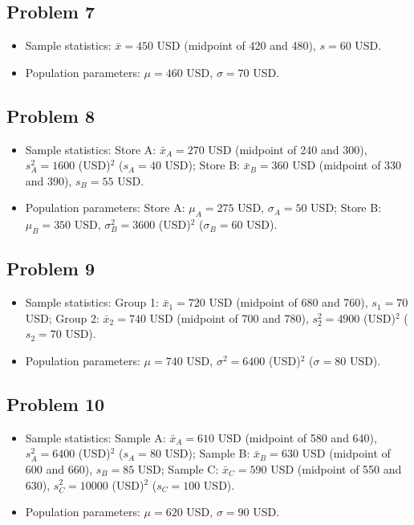 \subsection*{Problem 7}
\begin{itemize}
    \item Sample statistics: $\bar{x}=450$ USD (midpoint of 420 and 480), $s=60$ USD.
    \item Population parameters: $\mu=460$ USD, $\sigma=70$ USD.
\end{itemize}

\subsection*{Problem 8}
\begin{itemize}
    \item Sample statistics: Store A: $\bar{x}_A=270$ USD (midpoint of 240 and 300), $s_A^2=1600$ (USD)$^2$ ($s_A=40$ USD); Store B: $\bar{x}_B=360$ USD (midpoint of 330 and 390), $s_B=55$ USD.
    \item Population parameters: Store A: $\mu_A=275$ USD, $\sigma_A=50$ USD; Store B: $\mu_B=350$ USD, $\sigma_B^2=3600$ (USD)$^2$ ($\sigma_B=60$ USD).
\end{itemize}

\subsection*{Problem 9}
\begin{itemize}
    \item Sample statistics: Group 1: $\bar{x}_1=720$ USD (midpoint of 680 and 760), $s_1=70$ USD; Group 2: $\bar{x}_2=740$ USD (midpoint of 700 and 780), $s_2^2=4900$ (USD)$^2$ ($s_2=70$ USD).
    \item Population parameters: $\mu=740$ USD, $\sigma^2=6400$ (USD)$^2$ ($\sigma=80$ USD).
\end{itemize}

\subsection*{Problem 10}
\begin{itemize}
    \item Sample statistics: Sample A: $\bar{x}_A=610$ USD (midpoint of 580 and 640), $s_A^2=6400$ (USD)$^2$ ($s_A=80$ USD); Sample B: $\bar{x}_B=630$ USD (midpoint of 600 and 660), $s_B=85$ USD; Sample C: $\bar{x}_C=590$ USD (midpoint of 550 and 630), $s_C^2=10000$ (USD)$^2$ ($s_C=100$ USD).
    \item Population parameters: $\mu=620$ USD, $\sigma=90$ USD.
\end{itemize}


